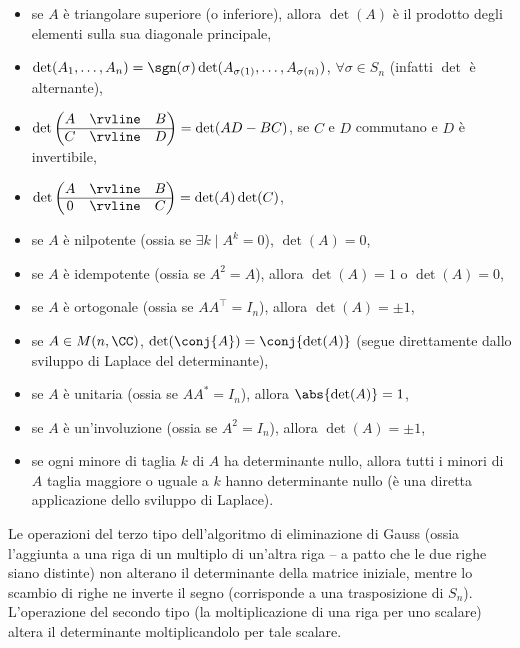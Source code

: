 \documentclass[10pt,landscape]{article}
\begin{document}
\begin{multicols}{3}
\begin{itemize}
			\item se $A$ è triangolare superiore (o inferiore), allora $\det(A)$ è
			il prodotto degli elementi sulla sua diagonale principale,
			\item $\det(A_1, \ldots, A_n) = \sgn(\sigma) \det(A_{\sigma(1)}, \ldots, A_{\sigma(n)})$, $\forall \sigma \in S_n$ (infatti $\det$ è alternante),
			\item \setlength{\extrarowheight}{1.3pt}$\det \begin{pmatrix}
				A
				& \rvline & B \\
				\hline
				C & \rvline &
				D
			\end{pmatrix} = \det(AD-BC)$, se $C$ e $D$ commutano e $D$ è invertibile,
			\item $\det \begin{pmatrix}
				A
				& \rvline & B \\
				\hline
				0 & \rvline &
				C
			\end{pmatrix} = \det(A)\det(C)$\setlength{\extrarowheight}{0pt},
			\item se $A$ è nilpotente (ossia se $\exists k \mid A^k = 0$),
			$\det(A) = 0$,
			\item se $A$ è idempotente (ossia se $A^2 = A$), allora
			$\det(A) = 1$ o $\det(A) = 0$,
			\item se $A$ è ortogonale (ossia se $AA^\top = I_n$), allora
			$\det(A) = \pm 1$,
			\item se $A \in M(n, \CC)$, $\det(\conj{A}) = \conj{\det(A)}$ (segue direttamente dallo sviluppo di Laplace del determinante), 
			\item se $A$ è unitaria (ossia se $AA^* = I_n$), allora $\abs{\det(A)} = 1$,
			\item se $A$ è un'involuzione (ossia se $A^2 = I_n$), allora
			$\det(A) = \pm 1$,
			\item se ogni minore di taglia $k$ di $A$ ha determinante nullo,
			allora tutti i minori di $A$ taglia maggiore o uguale a $k$ hanno
			determinante nullo (è una diretta applicazione dello sviluppo di Laplace).
		\end{itemize}
		
		Le operazioni del terzo tipo dell'algoritmo di eliminazione
		di Gauss (ossia l'aggiunta a una riga di un multiplo di un'altra
		riga -- a patto che le due righe siano distinte) non alterano il
		determinante della matrice iniziale, mentre lo scambio di righe
		ne inverte il segno (corrisponde a una trasposizione di $S_n$).
		L'operazione del secondo tipo (la moltiplicazione di una riga
		per uno scalare) altera il determinante moltiplicandolo per
		tale scalare.
		

\end{multicols}
\end{document}
